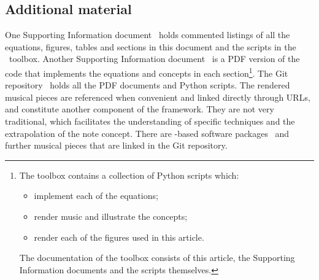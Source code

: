 \subsection{Additional material}
One Supporting Information document~\cite{massListings}
holds commented listings of all the equations, figures, tables and sections in this document
and the scripts in the \massa\ toolbox.
Another Supporting Information document~\cite{massCode} is a PDF version of
the code that implements the equations and concepts in each section\footnote{
	The toolbox contains a collection of Python scripts which:
\begin{itemize}
    \item implement each of the equations;
    \item render music and illustrate the concepts;
    \item render each of the figures used in this article.
\end{itemize}
The documentation of the toolbox consists of this article, the Supporting Information documents and the scripts themselves.}.
The Git repository~\cite{MASSA} holds all the PDF documents and Python scripts.
The rendered musical pieces are referenced when convenient and linked directly through URLs,
and constitute another component of the framework.
They are not very traditional, which facilitates the understanding of specific techniques
and the extrapolation of the note concept.
There are \mass -based software packages~\cite{music,figgus} and
further musical pieces that are linked in the Git repository.


